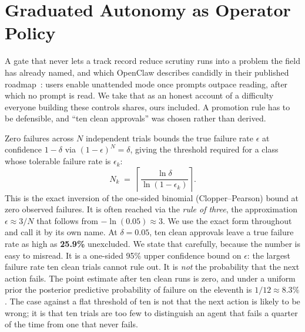 \documentclass[10pt]{article}
\begin{document}
\section{Graduated Autonomy as Operator Policy}
\label{sec:graduation}

A gate that never lets a track record reduce scrutiny runs into a problem the field
has already named, and which OpenClaw describes candidly in their published
roadmap~\cite{openclawroadmap}: users enable unattended mode once prompts outpace
reading, after which no prompt is read. We take that as an honest account of a
difficulty everyone building these controls shares, ours included. A promotion rule has to be defensible, and ``ten clean approvals'' was chosen rather
than derived.

Zero failures across $N$ independent trials bounds the true failure rate $\epsilon$
at confidence $1-\delta$ via $(1-\epsilon)^N = \delta$, giving the threshold required
for a class whose tolerable failure rate is $\epsilon_k$:
\[
  N_k \;=\; \left\lceil \frac{\ln \delta}{\ln (1-\epsilon_k)} \right\rceil .
\]
This is the exact inversion of the one-sided binomial (Clopper--Pearson) bound at
zero observed failures. It is often reached via the \emph{rule of three}, the
approximation $\epsilon \approx 3/N$ that follows from $-\ln(0.05) \approx 3$. We use
the exact form throughout and call it by its own name.
At $\delta = 0.05$, ten clean approvals leave a true failure rate as high as
\textbf{25.9\%} unexcluded. We state that carefully, because the number is easy to
misread. It is a one-sided 95\% upper confidence bound on $\epsilon$: the largest
failure rate ten clean trials cannot rule out. It is \emph{not} the probability that
the next action fails. The point estimate after ten clean runs is zero, and under a
uniform prior the posterior predictive probability of failure on the eleventh is
$1/12 \approx 8.3\%$. The case against a flat threshold of ten is not that the next
action is likely to be wrong; it is that ten trials are too few to distinguish an
agent that fails a quarter of the time from one that never fails.
\end{document}
